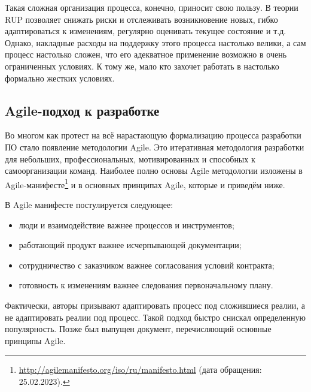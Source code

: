 \documentclass{../../text-style}
\begin{document}
Такая сложная организация процесса, конечно, приносит свою пользу. В теории RUP позволяет снижать риски и отслеживать возникновение новых, гибко адаптироваться к изменениям, регулярно оценивать текущее состояние и т.д. Однако, накладные расходы на поддержку этого процесса настолько велики, а сам процесс настолько сложен, что его адекватное применение возможно в очень ограниченных условиях. К тому же, мало кто захочет работать в настолько формально жестких условиях.

\subsection{Agile-подход к разработке}

Во многом как протест на всё нарастающую формализацию процесса разработки ПО стало появление методологии Agile. Это итеративная методология разработки для небольших, профессиональных, мотивированных и способных к самоорганизации команд. Наиболее полно основы Agile методологии изложены в Agile-манифесте\footnote{\url{http://agilemanifesto.org/iso/ru/manifesto.html} (дата обращения: 25.02.2023).} и в основных принципах Agile, которые и приведём ниже.

В Agile манифесте постулируется следующее:

\begin{itemize}
    \item люди и взаимодействие важнее процессов и инструментов;
    \item работающий продукт важнее исчерпывающей документации;
    \item сотрудничество с заказчиком важнее согласования условий контракта;
    \item готовность к изменениям важнее следования первоначальному плану.
\end{itemize}

Фактически, авторы призывают адаптировать процесс под сложившиеся реалии, а не адаптировать реалии под процесс. Такой подход быстро снискал определенную популярность. Позже был выпущен документ, перечисляющий основные принципы Agile.
\end{document}
